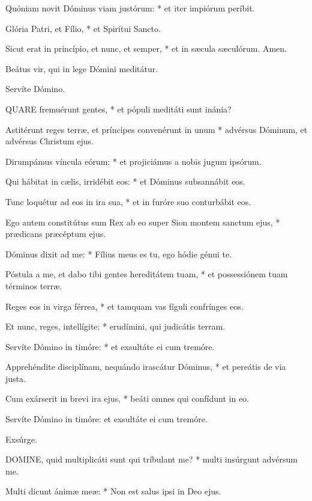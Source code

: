 Quóniam novit Dóminus viam justórum: * et iter impiórum períbit.

Glória Patri, et Fílio, * et Spirítui Sancto.

Sicut erat in princípio, et nunc, et semper, * et in sæcula sæculórum. Amen.


 Beátus vir, qui in lege Dómini meditátur.

 Servíte Dómino.


\lettrine[lines=2]{Q}{UARE} fremuérunt gentes, * et pópuli meditáti sunt inánia?

Astitérunt reges terræ, et príncipes convenérunt in unum * advérsus Dóminum, et advérsus Christum ejus.

Dirumpámus víncula eórum: * et projiciámus a nobis jugum ipsórum.

Qui hábitat in cælis, irridébit eos: * et Dóminus subsannábit eos.

Tunc loquétur ad eos in ira sua, * et in furóre suo conturbábit eos.

Ego autem constitútus sum Rex ab eo super Sion montem sanctum ejus, * prædicans præcéptum ejus.

Dóminus dixit ad me: * Fílius meus es tu, ego hódie génui te.

Póstula a me, et dabo tibi gentes hereditátem tuam, * et possessiónem tuam términos terræ.

Reges eos in virga férrea, * et tamquam vas fíguli confrínges eos.

Et nunc, reges, intellígite: * erudímini, qui judicátis terram.

Servíte Dómino in timóre: * et exsultáte ei cum tremóre.

Apprehéndite disciplínam, nequándo irascátur Dóminus, * et pereátis de via justa.

Cum exárserit in brevi ira ejus, * beáti omnes qui confídunt in eo.

 Servíte Dómino in timóre: et exsultáte ei cum tremóre.

 Exsúrge.


\lettrine[lines=2]{D}{OMINE}, quid multiplicáti sunt qui tríbulant me? * multi insúrgunt advérsum me.

Multi dicunt ánimæ meæ: * Non est salus ipsi in Deo ejus.

